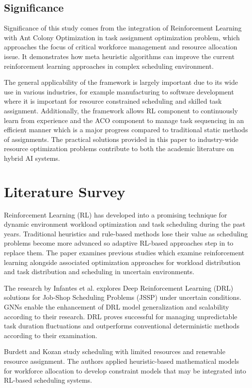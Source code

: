 \documentclass[conference]{IEEEtran}
\begin{document}
	\subsection{Significance}
	Significance of this study comes from the integration of Reinforcement Learning
	with Ant Colony Optimization in task assignment optimization problem, which
	approaches the focus of critical workforce management and resource allocation
	issue. It demonstrates how meta heuristic algorithms can improve the current reinforcement
	learning approaches in complex scheduling environment.

	The general applicability of the framework is largely important due to its wide
	use in various industries, for example manufacturing to software development
	where it is important for resource constrained scheduling and skilled task
	assignment. Additionally, the framework allows RL component to continuously
	learn from experience and the ACO component to manage task sequencing in an
	efficient manner which is a major progress compared to traditional static
	methods of assignments. The practical solutions provided in this paper to industry-wide
	resource optimization problems contribute to both the academic literature on hybrid
	AI systems.

	\section{Literature Survey}
	Reinforcement Learning (RL) has developed into a promising technique for dynamic
	environment workload optimization and task scheduling during the past years.
	Traditional heuristics and rule-based methods lose their value as scheduling
	problems become more advanced so adaptive RL-based approaches step in to
	replace them. The paper examines previous studies which examine reinforcement learning
	alongside associated optimization approaches for workload distribution and task
	distribution and scheduling in uncertain environments.

	The research by Infantes et al. \cite{infantes2024} explores Deep
	Reinforcement Learning (DRL) solutions for Job-Shop Scheduling Problems (JSSP)
	under uncertain conditions. GNNs enable the enhancement of DRL model generalization
	and scalability according to their research. DRL proves successful for
	managing unpredictable task duration fluctuations and outperforms conventional
	deterministic methods according to their examination.

	Burdett and Kozan \cite{burdett2004} study scheduling with limited resources
	and renewable resource assignment. The authors applied heuristic-based mathematical
	models for workforce allocation to develop constraint models that may be integrated
	into RL-based scheduling systems.
\end{document}
